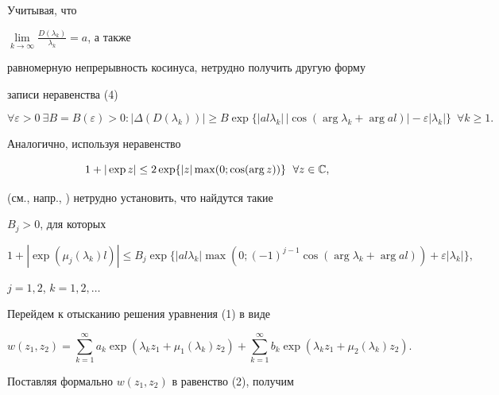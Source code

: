 Учитывая, что 


$\lim\limits_{k\to\infty}\frac{D(\lambda_k)}{\lambda_k}=a$, а также 


равномерную непрерывность косинуса, нетрудно получить другую форму


записи неравенства (4) 


\begin{equation} 


\forall\varepsilon>0\ \exists B=B(\varepsilon)>0: 


|\Delta(D(\lambda_k))|\ge B\exp\{|al\lambda_k|\,|\cos(\arg\lambda_k+ 


\arg al)|-\varepsilon|\lambda_k|\}\ \; \forall k\ge 1. 


\end{equation} 


Аналогично, используя неравенство 


$$ 


1+|\exp z|\le 2\exp\{|z|\max(0;\cos(\arg z))\} 


\ \; \forall z\in \Bbb C, 


$$ 


(см., напр., \cite{1}) нетрудно установить, что найдутся такие 


$B_j>0$, для которых 


\begin{equation} 


1+|\exp(\mu_j(\lambda_k)l)|\le B_j 


\exp\{|al\lambda_k|\max(0;(-1)^{j-1}\cos 


(\arg\lambda_k+\arg al))+\varepsilon|\lambda_k|\}, 


\end{equation} 


$j=1,2$, $k=1,2,\dotsc$ 


Перейдем к отысканию решения уравнения (1) в виде 


\begin{equation} 


w(z_1,z_2)=\sum^\infty_{k=1}a_k\exp(\lambda_k z_1+ 


\mu_1(\lambda_k)z_2)+\sum^\infty_{k=1}b_k 


\exp(\lambda_k z_1+\mu_2(\lambda_k)z_2). 


\end{equation} 


Поставляя формально $w(z_1,z_2)$ в равенство (2), получим 


